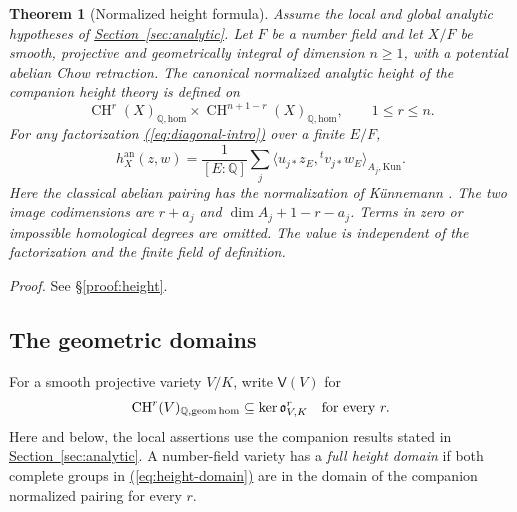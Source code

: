 \documentclass[11pt,a4paper]{article}
\newtheorem{theorem}{Theorem}[section]
\theoremstyle{definition}
\theoremstyle{remark}\newtheorem{remark}[theorem]{Remark}
\numberwithin{equation}{section}
\newcommand{\Q}{\mathbb Q}\newcommand{\R}{\mathbb R}\newcommand{\C}{\mathbb C}
\newcommand{\CH}{\operatorname{CH}}\newcommand{\an}{\mathrm{an}}
\newcommand{\homol}{\mathrm{hom}}\newcommand{\BC}{\mathrm{BC}}
\newcommand{\secref}[1]{\hyperref[#1]{\textcolor{sectionlink}{Section~\ref*{#1}}}}
\newcommand{\subref}[1]{\hyperref[#1]{\textcolor{sectionlink}{\S\ref*{#1}}}}
\renewcommand{\eqref}[1]{\hyperref[#1]{\textcolor{equationlink}{(\ref*{#1})}}}
\newcommand{\proofloc}[1]{\emph{Proof.} See \subref{#1}.}
\begin{document}
\begin{theorem}[Normalized height formula]\label{thm:height-main}
Assume the local and global analytic hypotheses of \secref{sec:analytic}.
Let $F$ be a number field and let $X/F$ be smooth, projective and
geometrically integral of dimension $n\ge1$, with a potential abelian
Chow retraction. The canonical normalized analytic height of the companion
height theory is defined on
\begin{equation}\label{eq:height-domain}
 \CH^r(X)_{\Q,\homol}\times\CH^{n+1-r}(X)_{\Q,\homol},
 \qquad 1\le r\le n.
\end{equation}
For any factorization \eqref{eq:diagonal-intro} over a finite $E/F$,
\begin{equation}\label{eq:height-main}
 h_X^{\an}(z,w)=\frac1{[E:\Q]}\sum_j
       \bigl\langle u_{j*}z_E,{}^tv_{j*}w_E\bigr\rangle_{A_j,\mathrm{Kun}}.
\end{equation}
Here the classical abelian pairing has the normalization of K\"unnemann
\cite{Kun}. The two image codimensions are
$r+a_j$ and $\dim A_j+1-r-a_j$. Terms in zero or impossible homological
degrees are omitted. The value is independent of the factorization and
the finite field of definition.
\end{theorem}

\proofloc{proof:height}


\subsection{The geometric domains}

For a smooth projective variety $V/K$, write $\mathsf V(V)$ for
\[
 \CH^r(V)_{\Q,\geomhom}\subseteq\ker\ob^r_{V,K}
 \quad\text{for every }r.
\]
Here and below, the local assertions use the companion results stated in
\secref{sec:analytic}. A number-field variety has a \emph{full height
domain} if both complete groups in \eqref{eq:height-domain} are in the
domain of the companion normalized pairing for every $r$.
\end{document}
